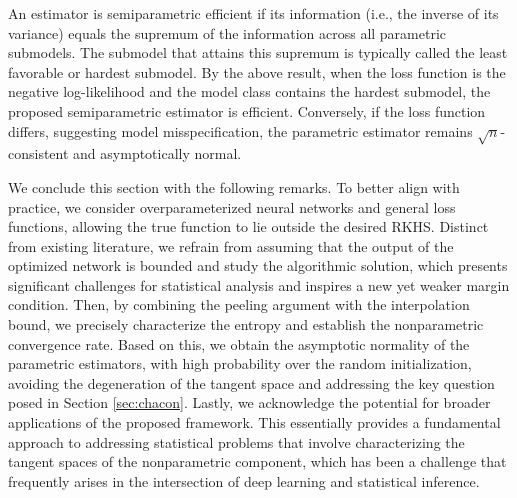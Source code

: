 An estimator is semiparametric efficient if its information (i.e., the inverse of its variance) equals the supremum of the information across all parametric submodels. The submodel that attains this supremum is typically called the least favorable or hardest submodel. By the above result, when the loss function is the negative log-likelihood and the model class contains the hardest submodel, the proposed semiparametric estimator is efficient. Conversely, if the loss function differs, suggesting model misspecification, the parametric estimator remains $\sqrt{n}$-consistent and asymptotically normal. 




We conclude this section with the following remarks. To better align with practice, we consider overparameterized neural networks and general loss functions, allowing the true function to lie outside the desired RKHS. Distinct from existing literature, we refrain from assuming that the output of the optimized network is bounded and study the algorithmic solution, which presents significant challenges for statistical analysis and inspires a new yet weaker margin condition. Then, by combining the peeling argument with the interpolation bound, we precisely characterize the entropy and establish the nonparametric convergence rate. Based on this, we obtain the asymptotic normality of the parametric estimators, with high probability over the random initialization, avoiding the degeneration of the tangent space and addressing the key question posed in Section \ref{sec:chacon}. Lastly, we acknowledge the potential for broader applications of the proposed framework. This essentially provides a fundamental approach to addressing statistical problems that involve characterizing the tangent spaces of the nonparametric component, which has been a challenge that frequently arises in the intersection of deep learning and statistical inference. 































